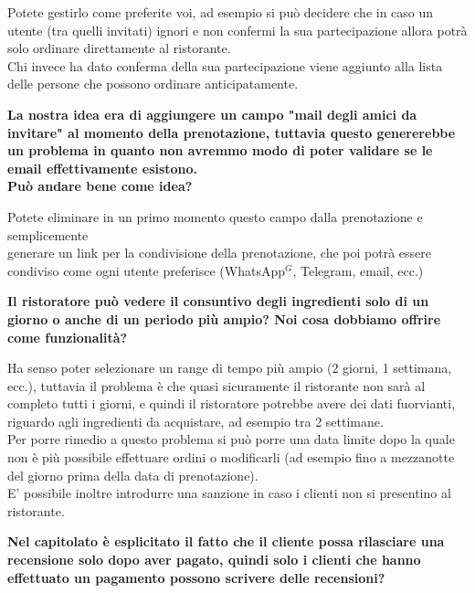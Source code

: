 \documentclass[a4paper, 11pt]{article}
\begin{document}
Potete gestirlo come preferite voi, ad esempio si può decidere che in caso un utente (tra quelli invitati) ignori e non confermi la sua partecipazione allora potrà solo ordinare direttamente al ristorante. \\
Chi invece ha dato conferma della sua partecipazione viene aggiunto alla lista delle persone che possono ordinare anticipatamente. \\ \newline


\textbf{La nostra idea era di aggiungere un campo "mail degli amici da invitare" al momento della prenotazione, tuttavia questo genererebbe un problema in quanto non avremmo modo di poter validare se le email effettivamente esistono. \\
Può andare bene come idea?}

Potete eliminare in un primo momento questo campo dalla prenotazione e semplicemente \\generare un link per la condivisione della prenotazione, che poi potrà essere condiviso come ogni utente preferisce (WhatsApp${^G}$, Telegram, email, ecc.) \\ \newline


\textbf{Il ristoratore può vedere il consuntivo degli ingredienti solo di un giorno o anche di un periodo più ampio? Noi cosa dobbiamo offrire come funzionalità?}

Ha senso poter selezionare un range di tempo più ampio (2 giorni, 1 settimana, ecc.), tuttavia il problema è che quasi sicuramente il ristorante non sarà al completo tutti i giorni, e quindi il ristoratore potrebbe avere dei dati fuorvianti, riguardo agli ingredienti da acquistare, ad esempio tra 2 settimane. \\
Per porre rimedio a questo problema si può porre una data limite dopo la quale non è più possibile effettuare ordini o modificarli (ad esempio fino a mezzanotte del giorno prima della data di prenotazione). \\ 
E' possibile inoltre introdurre una sanzione in caso i clienti non si presentino al ristorante. \\ \newline

\pagebreak

\textbf{Nel capitolato è esplicitato il fatto che il cliente possa rilasciare una recensione solo dopo aver pagato, quindi solo i clienti che hanno effettuato un pagamento possono scrivere delle recensioni?}
 
\end{document}
